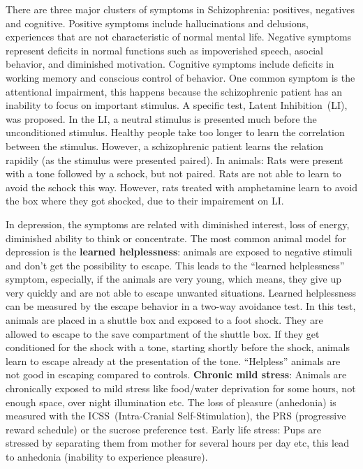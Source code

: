 \documentclass[12pt,article,oneside,a4paper]{memoir}
\begin{document}
\begin{enumerate}
There are three major clusters of symptoms in Schizophrenia: positives,
negatives and cognitive. Positive symptoms include hallucinations and
delusions, experiences that are not characteristic of normal mental life.
Negative symptoms represent deficits in normal functions such as impoverished
speech, asocial behavior, and diminished motivation. Cognitive symptoms include
deficits in working memory and conscious control of behavior.
One common symptom is the attentional impairment, this happens because the
schizophrenic patient has an inability to focus on important stimulus. A
specific test, Latent Inhibition~(LI), was proposed. In the LI, a neutral
stimulus is presented much before the unconditioned stimulus. Healthy people
take too longer to learn the correlation between the stimulus. However, a
schizophrenic patient learns the relation rapidily (as the stimulus were
presented paired).
In animals: Rats were present with a tone followed by a schock, but not paired.
Rats are not able to learn to avoid the schock this way. However, rats treated
with amphetamine learn to avoid the box where they got shocked, due to their
impairement on LI.

In depression, the symptoms are related with diminished interest, loss of
energy, diminished ability to think or concentrate. The most common animal
model for depression is the \textbf{learned helplessness}: animals are exposed
to negative stimuli and don't get the possibility to escape. This leads to the
``learned helplessness'' symptom, especially, if the animals are very young,
which means, they give up very quickly and are not able to escape unwanted
situations. Learned helplessness can be measured by the escape behavior in a
two-way avoidance test. In this test, animals are placed in a shuttle box and
exposed to a foot shock. They are allowed to escape to the save compartment of
the shuttle box. If they get conditioned for the shock with a tone, starting
shortly before the shock, animals learn to escape already at the presentation
of the tone. ``Helpless'' animals are not good in escaping compared to controls.
\textbf{Chronic mild stress}: Animals are chronically exposed to mild stress
like food/water deprivation for some hours, not enough space, over night
illumination etc. The loss of pleasure (anhedonia) is measured with the
ICSS~(Intra-Cranial Self-Stimulation), the PRS (progressive reward schedule) or
the sucrose preference test.
Early life stress: Pups are stressed by separating them from mother for several
hours per day etc, this lead to anhedonia (inability to experience pleasure).


\end{enumerate}
\end{document}
